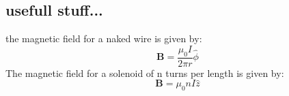 \documentclass[a4paper, 11pt]{article}
\begin{document}
	\subsection*{usefull stuff...} 
		the magnetic field for a naked wire is given by: 
			\begin{equation}
				\mathbf{B} = \frac{\mu_0 I}{2\pi r}\hat{\phi}
			\end{equation}
		The magnetic field for a solenoid of n turns per length is given by: 
			\begin{equation}
				\mathbf{B} = \mu_0 n I \hat{z} 
			\end{equation}
\end{document}

